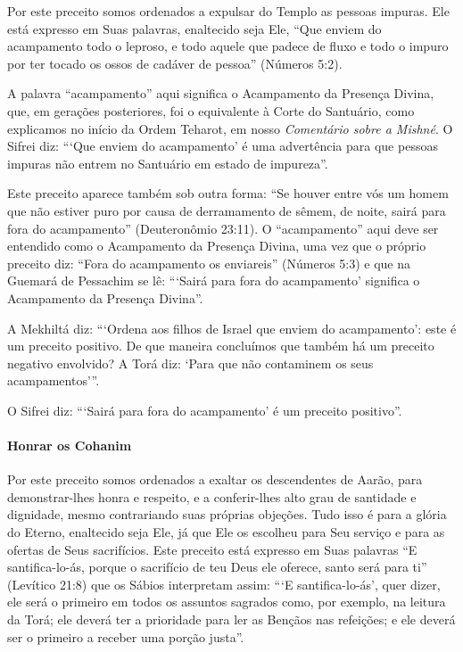 Por este preceito somos ordenados a expulsar do Templo as pessoas
impuras. Ele está expresso em Suas palavras, enaltecido seja Ele, ``Que
enviem do acampamento todo o leproso, e todo aquele que padece de fluxo
e todo o impuro por ter tocado os ossos de cadáver de pessoa'' (Números
5:2).

A palavra ``acampamento'' aqui significa o Acampamento da Presença
Divina, que, em gerações posteriores, foi o equivalente à Corte do
Santuário, como explicamos no início da Ordem Teharot, em nosso
\emph{Comentário sobre a Mishné}. O Sifrei diz: ```Que enviem do acampamento'
é uma advertência para que pessoas impuras não entrem no Santuário em
estado de impureza''.

Este preceito aparece também sob outra forma: ``Se houver entre vós
um homem que não estiver puro por causa de derramamento de sêmem, de
noite, sairá para fora do acampamento'' (Deuteronômio 23:11). O
``acampamento'' aqui deve ser entendido como o Acampamento da Presença
Divina, uma vez que o próprio preceito diz: ``Fora do acampamento os
enviareis'' (Números 5:3) e que na Guemará de Pessachim se lê: ```Sairá
para fora do acampamento' significa o Acampamento da Presença Divina''.

A Mekhiltá diz: ```Ordena aos filhos de Israel que enviem do
acampamento': este é um preceito positivo. De que maneira concluímos que
também há um preceito negativo envolvido? A Torá diz: `Para que não
contaminem os seus acampamentos'''.

O Sifrei diz: ```Sairá para fora do acampamento' é um preceito positivo''.

\paragraph{Honrar os Cohanim}

Por este preceito somos ordenados a exaltar os descendentes de Aarão,
para demonstrar-lhes honra e respeito, e a conferir-lhes alto grau de
santidade e dignidade, mesmo contrariando suas próprias objeções. Tudo
isso é para a glória do Eterno, enaltecido seja Ele, já que Ele os
escolheu para Seu serviço e para as ofertas de Seus sacrifícios. Este
preceito está expresso em Suas palavras ``E santifica-lo-ás, porque o
sacrifício de teu Deus ele oferece, santo será para ti'' (Levítico 21:8)
que os Sábios interpretam assim: ```E santifica-lo-ás', quer dizer, ele
será o primeiro em todos os assuntos sagrados como, por exemplo, na
leitura da Torá; ele deverá ter a prioridade para ler as Bençãos nas
refeições; e ele deverá ser o primeiro a receber uma porção justa''.


